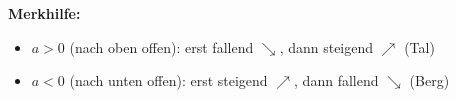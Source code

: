 \documentclass[12pt, a4paper]{article}
\begin{document}
\begin{center}
\fbox{%
    \parbox{0.7\textwidth}{%
        \centering
        $f$ ist \textbf{monoton steigend} auf $(-\infty,\, 3]$

        \vspace{0.3em}
        $f$ ist \textbf{monoton fallend} auf $[3,\, +\infty)$
    }%
}
\end{center}

\textbf{Merkhilfe:}
\begin{itemize}
    \item $a > 0$ (nach oben offen): erst fallend $\searrow$, dann steigend $\nearrow$ (Tal)
    \item $a < 0$ (nach unten offen): erst steigend $\nearrow$, dann fallend $\searrow$ (Berg)
\end{itemize}
\end{document}
